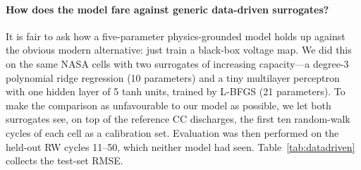 \documentclass[5p,times,number]{elsarticle}
\newcommand{\tabref}[1]{\hyperref[#1]{\textup{Table~\ref*{#1}}}}
\def\tabref#1{Table~\ref{#1}}
\begin{document}
\paragraph{How does the model fare against generic data-driven surrogates?}
It is fair to ask how a five-parameter physics-grounded model holds up against the obvious modern alternative: just train a black-box voltage map. We did this on the same NASA cells with two surrogates of increasing capacity---a degree-3 polynomial ridge regression (10 parameters) and a tiny multilayer perceptron with one hidden layer of 5 tanh units, trained by L-BFGS (21 parameters). To make the comparison as unfavourable to our model as possible, we let both surrogates see, on top of the reference CC discharges, the first ten random-walk cycles of each cell as a calibration set. Evaluation was then performed on the held-out RW cycles 11--50, which neither model had seen. \tabref{tab:datadriven} collects the test-set RMSE.
\begin{table}[!tb]
\centering
\caption{Data-driven surrogates compared with the proposed Shepherd model on held-out NASA random-walk cycles 11--50. The data-driven baselines were additionally calibrated on RW cycles 1--10 of each cell; the Shepherd model saw only the reference CC discharges. Mean $\pm$ std across $4 \times 40 = 160$ cycles.}\label{tab:datadriven}
{\footnotesize
{}
}
\end{table}
\end{document}
